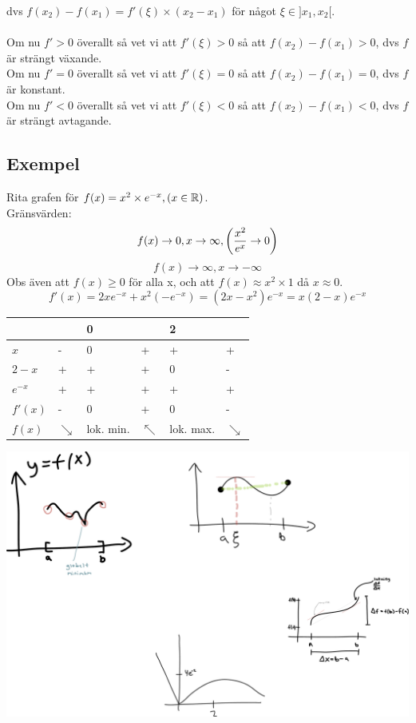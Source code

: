 \documentclass{article}
\begin{document}
dvs $f(x_2) - f(x_1) = f'(\xi) \times (x_2-x_1)$ för något $\xi \in ]x_1, x_2[$.\\\\
Om nu $f'>0$ överallt så vet vi att $f'(\xi)>0$ så att $f(x_2)-f(x_1)>0$, dvs $f$ är strängt växande.\\
Om nu $f'=0$ överallt så vet vi att $f'(\xi)=0$ så att $f(x_2)-f(x_1)=0$, dvs $f$ är konstant.\\
Om nu $f'<0$ överallt så vet vi att $f'(\xi)<0$ så att $f(x_2)-f(x_1)<0$, dvs $f$ är strängt avtagande.

\subsection{Exempel}
Rita grafen för $f(x)=x^2\times e^{-x}, (x\in{\mathbb R})$.\\
Gränsvärden:
$$ f(x)\to 0, x\to\infty, \left(\frac{x^2}{e^x}\to 0\right)$$
$$ f(x)\to\infty, x\to -\infty $$
Obs även att $f(x)\ge 0$ för alla x, och att $f(x)\approx x^2\times 1$ då $x\approx 0$.
$$ f'(x) = 2xe^{-x} + x^2(-e^{-x}) = (2x-x^2)e^{-x} = x(2-x)e^{-x} $$

\begin{tabular}{ l l p{7mm} l p{7mm} l }
  && 0 && 2 &\\ \hline
  $x$ & - & 0 & + & + & + \\
  $2-x$ & + & + & + & 0 & - \\
  $e^{-x}$ & + & + & + & + & + \\ \hline
  $f'(x)$ & - & 0 & + & 0 & - \\
  $f(x)$ & $\searrow$ & lok. min. & $\nwarrow$ & lok. max. & $\searrow$
\end{tabular}

\includegraphics[width=\textwidth]{img/graph4.pdf}
\end{document}
